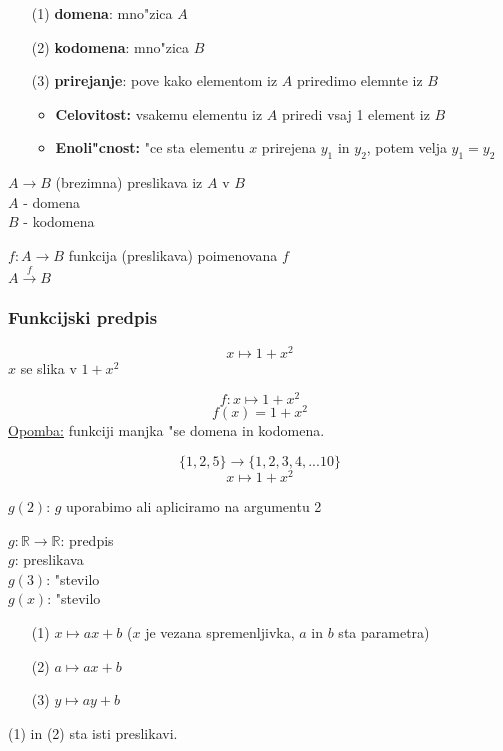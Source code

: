 \begin{itemize}
	\item[(1)] \textbf{domena}: mno"zica \(A\)
	\item[(2)] \textbf{kodomena}: mno"zica \(B\)
	\item[(3)] \textbf{prirejanje}: pove kako elementom iz \(A\) priredimo elemnte iz \(B\)
	\begin{itemize}
		\item \textbf{Celovitost:} vsakemu elementu iz \(A\) priredi vsaj 1 element iz \(B\)
		\item \textbf{Enoli"cnost:} "ce sta elementu \(x\) prirejena \(y_1\) in \(y_2\), potem velja \(y_1 = y_2\)
	\end{itemize}
\end{itemize}

\(A \rightarrow B\) (brezimna) preslikava iz \(A\) v \(B\) \\
\(A\) - domena\\
\(B\) - kodomena

\(f: A \rightarrow B\) funkcija (preslikava) poimenovana \(f\)\\
\(A \stackrel{f}{\rightarrow} B\)

\subsubsection*{Funkcijski predpis}
\[x \mapsto 1 + x^2\]
\(x\) se slika v \(1 + x^2\)

\[f: x \mapsto 1 + x^2\]
\[f(x) = 1 + x^2\]
\underline{Opomba:} funkciji manjka "se domena in kodomena.

\[\{1, 2, 5\} \rightarrow \{1, 2, 3, 4, ... 10\}\]
\[x \mapsto 1+ x^2\]

\(g(2)\): \(g\) uporabimo ali apliciramo na argumentu 2

\(g: \mathbb{R} \rightarrow \mathbb{R}\): predpis\\
\(g\): preslikava\\
\(g(3)\): "stevilo\\
\(g(x)\): "stevilo

\begin{itemize}
	\item[(1)] \(x \mapsto ax + b\) (\(x\) je vezana spremenljivka, \(a\) in \(b\) sta parametra)
	\item[(2)] \(a \mapsto ax + b\)
	\item[(3)] \(y \mapsto ay + b\)
\end{itemize}

(1) in (2) sta isti preslikavi.

